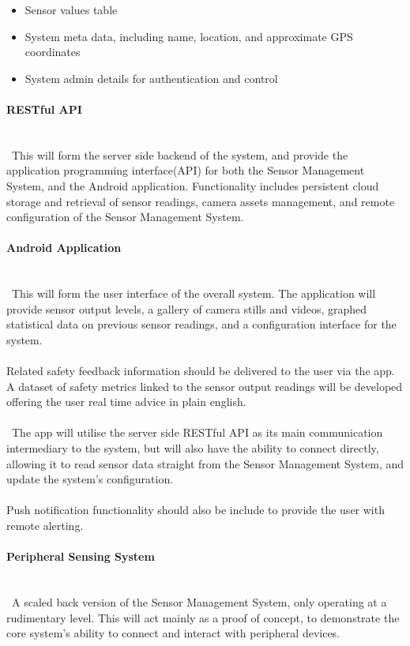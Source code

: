 \documentclass{article}
\begin{document}
\begin{itemize}
  \item Sensor values table
  \item System meta data, including name, location, and approximate GPS coordinates 
  \item System admin details for authentication and control
\end{itemize}

\paragraph{RESTful API}
\noindent
\\\
This will form the server side backend of the system, and provide the application programming interface(API) for both the Sensor Management System, and the Android application. Functionality includes persistent cloud storage and retrieval of sensor readings, camera assets management, and remote configuration of the Sensor Management System.

\paragraph{Android Application}
\noindent
\\\
This will form the user interface of the overall system. The application will provide sensor output levels, a gallery of camera stills and videos, graphed statistical data on previous sensor readings, and a configuration interface for the system.\\\\
Related safety feedback information should be delivered to the user via the app. A dataset of safety metrics linked to the sensor output readings will be developed offering the user real time advice in plain english.\\\\\
The app will utilise the server side RESTful API as its main communication intermediary to the system, but will also have the ability to connect directly, allowing it to read sensor data straight from the Sensor Management System, and update the system\rq s configuration. \\\\
Push notification functionality should also be include to provide the user with remote alerting.

\paragraph{Peripheral Sensing System}
\noindent
\\\
A scaled back version of the Sensor Management System, only operating at a rudimentary level. This will act mainly as a proof of concept, to demonstrate the core system\rq s ability to connect and interact with peripheral devices. 
\end{document}
